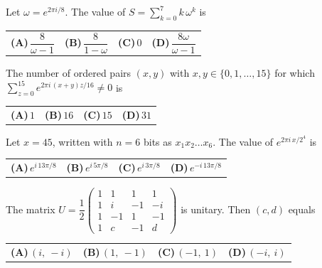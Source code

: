 \documentclass[11pt,a4paper]{article}
\newcommand{\optlabel}[1]{\textbf{(#1)}}
\newenvironment{qitem}[1]{\begin{list}{}{\setlength{\leftmargin}{3.3em}\setlength{\labelwidth}{3.1em}%
  \setlength{\labelsep}{0.2em}\setlength{\topsep}{3pt}\setlength{\parsep}{3pt}}\item[\textbf{Q.#1}\hfill]}{\end{list}}
\newcommand{\qsep}{\par\vspace{2pt}{\color{black!15}\hrule}\vspace{4pt}}
\begin{document}
\begin{qitem}{1}
Let $\omega = e^{2\pi i/8}$. The value of $\displaystyle S = \sum_{k=0}^{7} k\,\omega^{k}$ is
\par\smallskip\noindent\begin{tabularx}{\linewidth}{@{}*{4}{L}@{}}
\optlabel{A}\,$\dfrac{8}{\omega - 1}$ & \optlabel{B}\,$\dfrac{8}{1-\omega}$ & \optlabel{C}\,$0$ & \optlabel{D}\,$\dfrac{8\omega}{\omega-1}$
\end{tabularx}
\end{qitem}
\qsep

\begin{qitem}{2}
The number of ordered pairs $(x, y)$ with $x, y \in \{0, 1, \dots, 15\}$ for which
$\displaystyle \sum_{z=0}^{15} e^{2\pi i\,(x+y)z/16} \neq 0$ is
\par\smallskip\noindent\begin{tabularx}{\linewidth}{@{}*{4}{L}@{}}
\optlabel{A}\,$1$ & \optlabel{B}\,$16$ & \optlabel{C}\,$15$ & \optlabel{D}\,$31$
\end{tabularx}
\end{qitem}
\qsep

\begin{qitem}{3}
Let $x = 45$, written with $n = 6$ bits as $x_1x_2\dots x_6$. The value of $e^{2\pi i\,x/2^4}$ is
\par\smallskip\noindent\begin{tabularx}{\linewidth}{@{}*{4}{L}@{}}
\optlabel{A}\,$e^{i\,13\pi/8}$ & \optlabel{B}\,$e^{i\,5\pi/8}$ & \optlabel{C}\,$e^{i\,3\pi/8}$ & \optlabel{D}\,$e^{-i\,13\pi/8}$
\end{tabularx}
\end{qitem}
\qsep

\begin{qitem}{4}
The matrix $U = \dfrac12\begin{pmatrix}1&1&1&1\\ 1&i&-1&-i\\ 1&-1&1&-1\\ 1&c&-1&d\end{pmatrix}$ is unitary. Then $(c, d)$ equals
\par\smallskip\noindent\begin{tabularx}{\linewidth}{@{}*{4}{L}@{}}
\optlabel{A}\,$(i,\ -i)$ & \optlabel{B}\,$(1,\ -1)$ & \optlabel{C}\,$(-1,\ 1)$ & \optlabel{D}\,$(-i,\ i)$
\end{tabularx}
\end{qitem}
\qsep
\end{document}
